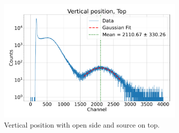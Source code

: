 \begin{figure}[hp]
    \centering
    \vspace{0.5cm}
    \begin{subfigure}[t]{0.48\textwidth}
        \includegraphics[width=\textwidth]{fig/lightyield/ej200/bps_ej200.pdf}
        \caption{Vertical position with open side and source on top.}\label{fig:lightyield:ej200:measurement:1}
    \end{subfigure}
    \hfill
    \begin{subfigure}[t]{0.48\textwidth}

\end{subfigure}
\end{figure}
